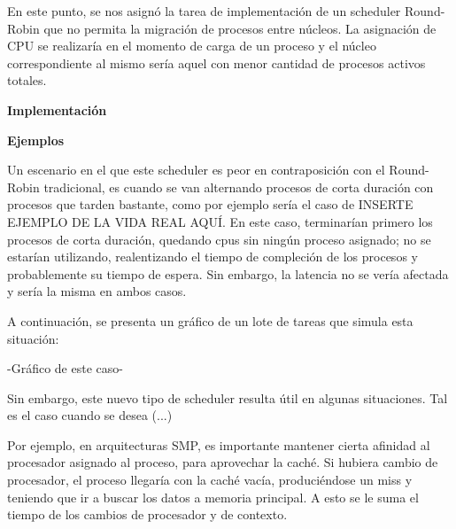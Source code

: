 En este punto, se nos asignó la tarea de implementación de un scheduler Round-Robin que no permita la migración de procesos
entre núcleos. La asignación de CPU se realizaría en el momento de carga de un proceso y el núcleo correspondiente al mismo sería aquel con menor cantidad de procesos activos totales.

\textbf{Implementación}

\textbf{Ejemplos}

Un escenario en el que este scheduler es peor en contraposición con el Round-Robin tradicional, es cuando se van alternando procesos de corta duración con procesos que tarden bastante, como por ejemplo sería el caso de INSERTE EJEMPLO DE LA VIDA REAL AQUÍ. En este caso, terminarían primero los procesos de corta duración, quedando cpus sin ningún proceso asignado; no se estarían utilizando, realentizando el tiempo de compleción de los procesos y probablemente su tiempo de espera. Sin embargo, la latencia no se vería afectada y sería la misma en ambos casos.

A continuación, se presenta un gráfico de un lote de tareas que simula esta situación:

-Gráfico de este caso-



Sin embargo, este nuevo tipo de scheduler resulta útil en algunas situaciones. Tal es el caso cuando se desea (...)

Por ejemplo, en arquitecturas SMP, es importante mantener cierta afinidad al procesador asignado al proceso, para aprovechar la caché. Si hubiera cambio de procesador, el proceso llegaría con la caché vacía, produciéndose un miss y teniendo que ir a buscar los datos a memoria principal. A esto se le suma el tiempo de los cambios de procesador y de contexto.





